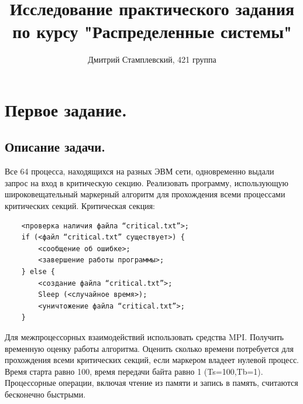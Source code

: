 \documentclass{article}
\title{Исследование практического задания по курсу "Распределенные системы"}
\author{Дмитрий Стамплевский, 421 группа}
\date{}
\begin{document}
\maketitle
\section{Первое задание.}

\subsection{Описание задачи.}
Все 64 процесса, находящихся на разных ЭВМ сети, одновременно выдали запрос на вход в критическую секцию.
Реализовать программу, использующую широковещательный маркерный алгоритм для прохождения всеми процессами критических секций.
Критическая секция:
\begin{verbatim}
    <проверка наличия файла “critical.txt”>;
    if (<файл “critical.txt” существует>) {
        <сообщение об ошибке>;
        <завершение работы программы>;
    } else {
        <создание файла “critical.txt”>;
        Sleep (<случайное время>);
        <уничтожение файла “critical.txt”>;
    }
\end{verbatim}
Для межпроцессорных взаимодействий использовать средства MPI.
Получить временную оценку работы алгоритма. Оценить сколько времени потребуется для прохождения всеми критических секций, если маркером владеет нулевой процесс. Время старта равно 100, время передачи байта равно 1 (Ts=100,Tb=1). Процессорные операции, включая чтение из памяти и запись в память, считаются бесконечно быстрыми.
\end{document}
